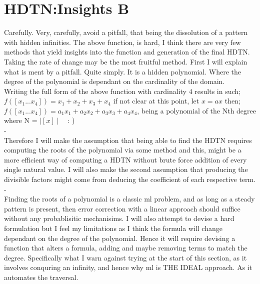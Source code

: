 \documentclass{article}
\begin{document}
\section{HDTN:Insights B}
Carefully. Very, carefully, avoid a pitfall, that being the dissolution of a pattern with hidden infinities.
The above function, is hard, I think there are very few methods that yield insights into the function and generation
of the final HDTN. Taking the rate of change may be the most fruitful method. First I will explain what is ment by a pitfall.
Quite simply. It is a hidden polynomial. Where the degree of the polynomial is dependant on the cardinality of the domain.\\
Writing the full form of the above function with cardinality 4 results in such;\\
$f([x_1...x_4])=x_1+x_2+x_3+x_4$ if not clear at this point, let $x = ax$ then;\\
$f([x_1...x_4])=a_1x_1+a_2x_2+a_3x_3+a_4x_4$, being a polynomial of the Nth degree where N = $\mid[x]\mid$\ \ : )\\
{\color{white}-}\\
Therefore I will make the assumption that being able to find the HDTN requires computing the roots of the polynomial via some method
and this, might be a more efficient way of computing a HDTN without brute force addition of every single natural value. I will also
make the second assumption that producing the divisible factors might come from deducing the coefficient of each respective term.\\
{\color{white}-}\\
Finding the roots of a polynomial is a classic ml problem, and as long as a steady pattern is present, then error correction with
a linear approach should suffice without any probablisitic mechanisims. I will also attempt to devise a hard formulation but I feel
my limitations as I think the formula will change dependant on the degree of the polynomial. Hence it will require devising a
function that alters a formula, adding and maybe removing terms to match the degree. Specifically what I warn against trying at the 
start of this section, as it involves conquring an infinity, and hence why ml is THE IDEAL approach. As it automates the traversal.
\end{document}
